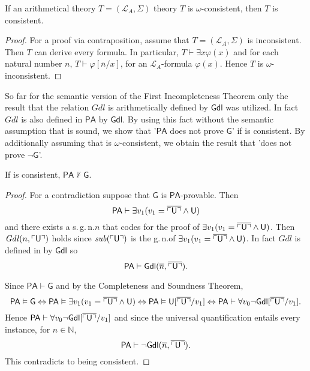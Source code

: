 \begin{prop} \label{prop:omegaconsistent}
If an arithmetical theory $T= (\mathcal{L}_A, \Sigma)$ theory $T$ is $\omega$-consistent, then $T$ is consistent.
\end{prop}
\begin{proof}
For a proof via contraposition, assume that $T=(\mathcal{L}_A, \Sigma)$ is inconsistent. Then $T$ can derive every formula. In particular, $T \vdash \exists x  \varphi(x)$ and for each natural number $n$, $T \vdash \varphi[\overline{n}/x]$, for an $\mathcal{L}_A$-formula $\varphi(x)$. Hence $T$ is $\omega$-inconsistent.
\end{proof}

So far for the semantic version of the First Incompleteness Theorem only the result that the relation $\mathit{Gdl}$ is arithmetically defined by $\mathsf{Gdl}$ was utilized. In fact $\mathit{Gdl}$ is also defined in $\mathsf{PA}$ by $\mathsf{Gdl}$. By using this fact without the semantic assumption that \PA is sound, we show that '$\mathsf{PA}$ does not prove $\mathsf{G}$' if \PA is consistent. By additionally assuming that \PA is $\omega$-consistent, we obtain the result that '\PA does not prove $\lnot \mathsf{G}$'. 

\begin{thm} \label{thm:PA_Consistent}
If \PA is consistent, $\mathsf{PA} \nvdash \mathsf{G}$.
\end{thm}

\begin{proof}
For a contradiction suppose that $\mathsf{G}$ is $\mathsf{PA}$-provable. Then
\[ \mathsf{PA} \vdash \exists v_1 (v_1 = \overline{\ulcorner \mathsf{U} \urcorner} \wedge\mathsf{ U}) \] 
and there exists a s.\,g.\,n.\@ $n$ that codes for the proof of $\exists v_1 (v_1 = \overline{\ulcorner \mathsf{U} \urcorner} \wedge\mathsf{ U})$. Then $\mathit{Gdl}(n,\ulcorner \mathsf{U} \urcorner )$ holds since $\mathit{sub}(\ulcorner \mathsf{U} \urcorner)$ is the g.\,n.\@ of $\exists v_1 (v_1 = \overline{\ulcorner \mathsf{U} \urcorner} \wedge\mathsf{ U})$. In fact $\mathit{Gdl}$ is defined in \PA by $\mathsf{Gdl}$ so \[\mathsf{PA} \vdash \mathsf{Gdl}(\overline{n}, \overline{\ulcorner \mathsf{U} \urcorner}).\]

Since $\mathsf{PA \vdash G}$ and by the Completeness and Soundness Theorem,
\[ \mathsf{PA} \vDash \mathsf{G} \Leftrightarrow \mathsf{PA} \vDash  \exists v_1 (v_1 = \overline{\ulcorner \mathsf{U} \urcorner} \wedge\mathsf{ U}) 
\Leftrightarrow \mathsf{PA} \vDash \mathsf{U}[\overline{\ulcorner\mathsf{U} \urcorner }/v_1] \Leftrightarrow \mathsf{PA} \vdash  \forall v_0  \lnot \mathsf{Gdl}[\overline{\ulcorner \mathsf{U} \urcorner }/v_1 ]. \] Hence $\mathsf{PA} \vdash \forall v_0 \lnot \mathsf{Gdl}[\overline{\ulcorner\mathsf{ U }\urcorner}/v_1]$ and since the universal quantification entails every instance, for $n\in \mathbb{N}$, \[\mathsf{PA} \vdash  \lnot \mathsf{Gdl}(\overline{n}, \overline{\ulcorner \mathsf{U} \urcorner}). \] This contradicts to \PA being consistent.
\end{proof}

